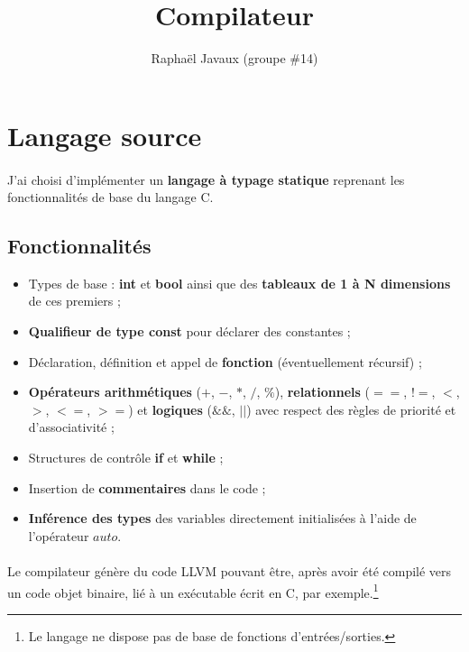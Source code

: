 \documentclass[a4paper]{article}
\title{Compilateur}
\author{Raphaël Javaux (groupe \#14)}
\date{}
\begin{document}
\maketitle

\tableofcontents

\newpage

 \section{Langage source}

    \paragraph{}J'ai choisi d'implémenter un \textbf{langage à typage statique}
reprenant les fonctionnalités de base du langage C.

  \subsection{Fonctionnalités}

    \begin{itemize}
        \item Types de base : \textbf{int} et \textbf{bool} ainsi que des
\textbf{tableaux de 1 à N dimensions} de ces premiers ;
        \item \textbf{Qualifieur de type const} pour déclarer des constantes ;
        \item Déclaration, définition et appel de \textbf{fonction}
(éventuellement récursif) ;
        \item \textbf{Opérateurs arithmétiques} ($+$, $-$, $*$, $/$, $\%$),
\textbf{relationnels} ($==$, $!=$, $<$, $>$, $<=$, $>=$) et \textbf{logiques}
($\&\&$, $||$) avec respect des règles de priorité et d'associativité ;
        \item Structures de contrôle \textbf{if} et \textbf{while} ;
        \item Insertion de \textbf{commentaires} dans le code ;
        \item \textbf{Inférence des types} des variables directement
initialisées à l'aide de l'opérateur $auto$.
    \end{itemize}

    \paragraph{}Le compilateur génère du code LLVM pouvant être, après avoir
été compilé vers un code objet binaire, lié à un exécutable écrit en C, par
exemple.\footnote{Le langage ne dispose pas de base de fonctions
d'entrées/sorties.}
\end{document}
